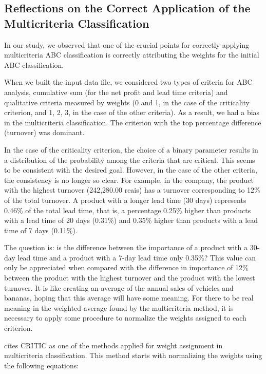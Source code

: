 \documentclass[10pt,fleqn,a4paper,twoside]{article}
\begin{document}
\subsection{Reflections on the Correct Application of the Multicriteria Classification}

In our study, we observed that one of the crucial points for correctly applying multicriteria ABC classification is correctly attributing the weights for the initial ABC classification.

When we built the input data file, we considered two types of criteria for ABC analysis, cumulative sum (for the net profit and lead time criteria) and qualitative criteria measured by weights (0 and 1, in the case of the criticality criterion, and 1, 2, 3, in the case of the other criteria). As a result, we had a bias in the multicriteria classification. The criterion with the top percentage difference (turnover) was dominant.

In the case of the criticality criterion, the choice of a binary parameter results in a distribution of the probability among the criteria that are critical. This seems to be consistent with the desired goal. However, in the case of the other criteria, the consistency is no longer so clear. For example, in the company, the product with the highest turnover (242,280.00 reais) has a turnover corresponding to 12\% of the total turnover. A product with a longer lead time (30 days) represents 0.46\% of the total lead time, that is, a percentage 0.25\% higher than products with a lead time of 20 days (0.31\%) and 0.35\% higher than products with a lead time of 7 days (0.11\%).  

The question is: is the difference between the importance of a product with a 30-day lead time and a product with a 7-day lead time only 0.35\%? This value can only be appreciated when compared with the difference in importance of 12\% between the product with the highest turnover and the product with the lowest turnover. It is like creating an average of the annual sales of vehicles and bananas, hoping that this average will have some meaning. For there to be real meaning in the weighted average found by the multicriteria method, it is necessary to apply some procedure to normalize the weights assigned to each criterion.
	
	\citet{Odu2019} cites CRITIC as one of the methods applied for weight assignment in multicriteria classification. This method starts with normalizing the weights using the following equations:
	
\end{document}

